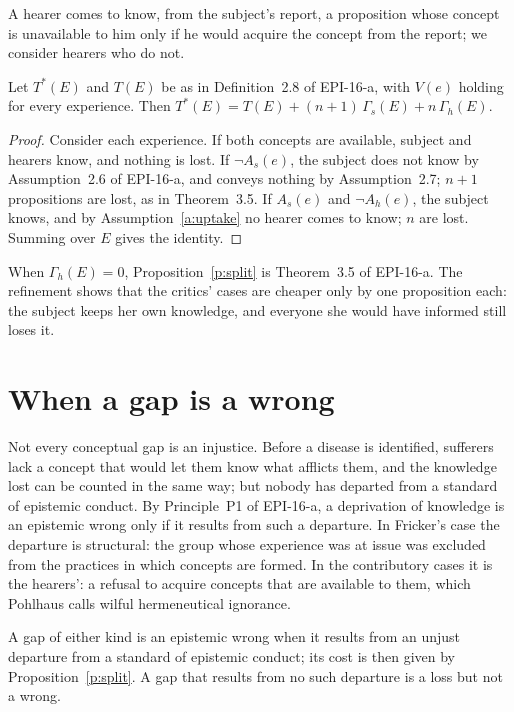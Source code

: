\documentclass{situationist-preprint}
\begin{document}
\begin{assumption}[Uptake]\label{a:uptake}
A hearer comes to know, from the subject's report, a proposition whose concept is unavailable to him only if he would acquire the concept from the report; we consider hearers who do not.
\end{assumption}

\begin{proposition}\label{p:split}
Let $T^{*}(E)$ and $T(E)$ be as in Definition~2.8 of EPI-16-a, with $V(e)$ holding for every experience. Then $T^{*}(E) = T(E) + (n+1)\,\Gamma_s(E) + n\,\Gamma_h(E)$.
\end{proposition}

\begin{proof}
Consider each experience. If both concepts are available, subject and hearers know, and nothing is lost. If $\neg A_s(e)$, the subject does not know by Assumption~2.6 of EPI-16-a, and conveys nothing by Assumption~2.7; $n+1$ propositions are lost, as in Theorem~3.5. If $A_s(e)$ and $\neg A_h(e)$, the subject knows, and by Assumption~\ref{a:uptake} no hearer comes to know; $n$ are lost. Summing over $E$ gives the identity.
\end{proof}

When $\Gamma_h(E) = 0$, Proposition~\ref{p:split} is Theorem~3.5 of EPI-16-a. The refinement shows that the critics' cases are cheaper only by one proposition each: the subject keeps her own knowledge, and everyone she would have informed still loses it.

\section{When a gap is a wrong}

Not every conceptual gap is an injustice. Before a disease is identified, sufferers lack a concept that would let them know what afflicts them, and the knowledge lost can be counted in the same way; but nobody has departed from a standard of epistemic conduct. By Principle~P1 of EPI-16-a, a deprivation of knowledge is an epistemic wrong only if it results from such a departure. In Fricker's case the departure is structural: the group whose experience was at issue was excluded from the practices in which concepts are formed. In the contributory cases it is the hearers': a refusal to acquire concepts that are available to them, which Pohlhaus calls wilful hermeneutical ignorance.

\begin{corollary}\label{c:wrong}
A gap of either kind is an epistemic wrong when it results from an unjust departure from a standard of epistemic conduct; its cost is then given by Proposition~\ref{p:split}. A gap that results from no such departure is a loss but not a wrong.
\end{corollary}
\end{document}
